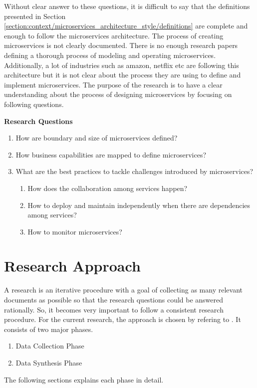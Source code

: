Without clear answer to these questions, it is difficult to say that the definitions presented in Section \ref{section:context/microservices_architecture_style/definitions} are complete and enough to follow the microservices architecture. The process of creating microservices is not clearly documented. There is no enough research papers defining a thorough process of modeling and operating microservices. Additionally, a lot of industries such as amazon, netflix etc are following this architecture but it is not clear about the process they are using to define and implement microservices. The purpose of the research is to have a clear understanding about the process of designing microservices by focusing on following questions.
\begin{shaded}
\textbf{Research Questions}\label{list:introduction/research_questions}
\end{shaded}
\begin{enumerate}
\item How are boundary and size of microservices defined?
\item How business capabilities are mapped to define microservices?
\item What are the best practices to tackle challenges introduced by microservices?
    \begin{enumerate}
    \item How does the collaboration among services happen?
    \item How to deploy and maintain independently when there are dependencies among services?
    \item How to monitor microservices?
    \end{enumerate}
\end{enumerate}
\section{Research Approach}\label{section:context/approach}
A research is an iterative procedure with a goal of collecting as many relevant documents as possible so that the research questions could be answered rationally. So, it becomes very important to follow a consistent research procedure. For the current research, the approach is chosen by refering to \cite{np:2007aa}. It consists of two major phases.
\begin{enumerate}
\item {Data Collection Phase}
\item {Data Synthesis Phase}
\end{enumerate}
The following sections explains each phase in detail.
